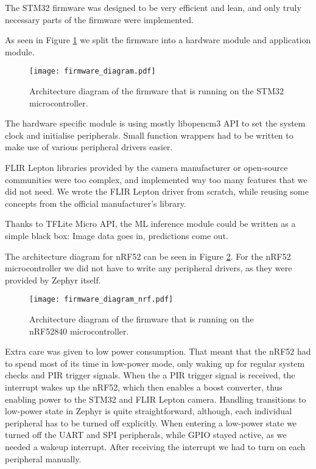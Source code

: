 The STM32 firmware was designed to be very efficient and lean, and only truly necessary parts of the firmware were implemented.

As seen in Figure \ref{firmware_diagram} we split the firmware into a hardware module and application module.
\newline
\begin{figure}[ht]
        \centering
        \texttt{[image: firmware\_diagram.pdf]} 
        \caption{ Architecture diagram of the firmware that is running on the STM32 microcontroller.} 
        \label{firmware_diagram}
\end{figure}

The hardware specific module is using mostly libopencm3 API to set the system clock and initialise peripherals.
Small function wrappers had to be written to make use of various peripheral drivers easier.

FLIR Lepton libraries provided by the camera manufacturer or open-source communities were too complex, and implemented way too many features that we did not need.
We wrote the FLIR Lepton driver from scratch, while reusing some concepts from the official manufacturer's library.

Thanks to TFLite Micro API, the ML inference module could be written as a simple black box: Image data goes in, predictions come out.

The architecture diagram for nRF52 can be seen in Figure \ref{firmware_diagram_wisent}.
For the nRF52 microcontroller we did not have to write any peripheral drivers, as they were provided by Zephyr itself.
\newline
\begin{figure}[ht]
        \centering
        \texttt{[image: firmware\_diagram\_nrf.pdf]} 
        \caption{ Architecture diagram of the firmware that is running on the nRF52840 microcontroller.} 
        \label{firmware_diagram_wisent}
\end{figure}

Extra care was given to low power consumption.
That meant that the nRF52 had to spend most of its time in low-power mode, only waking up for regular system checks and PIR trigger signals.
When the a PIR trigger signal is received, the interrupt wakes up the nRF52, which then enables a boost converter, thus enabling power to the STM32 and FLIR Lepton camera.
Handling transitions to low-power state in Zephyr is quite straightforward, although, each individual peripheral has to be turned off explicitly.
When entering a low-power state we turned off the UART and SPI peripherals, while GPIO stayed active, as we needed a wakeup interrupt.
After receiving the interrupt we had to turn on each peripheral manually.

